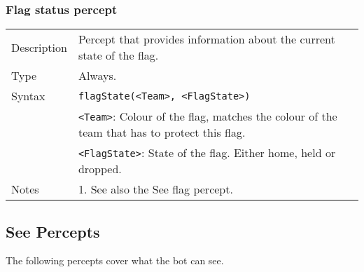 \documentclass[11pt,a4paper]{article}
\begin{document}
\subsubsection*{Flag status percept}
\begin{small}
\begin{tabular}{p{2cm}p{9cm}}
Description & Percept that provides information about the current state of the flag.\\
Type & Always.\\
Syntax & \verb|flagState(<Team>, <FlagState>)|\\
& \verb|<Team>|: Colour of the flag, matches the colour of the team that has to protect this flag.\\ 
& \verb|<FlagState>|: State of the flag. Either home, held or dropped.\\
Notes & 
	1.	See also the See flag percept.
\end{tabular}
\end{small}

\subsection{See Percepts}
The following percepts cover what the bot can see. 
\end{document}
